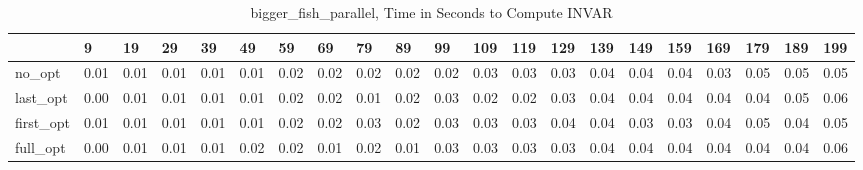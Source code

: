 \begin{table}
\caption{bigger_fish_parallel, Time in Seconds to Compute INVAR}
\label{bigger_fish_parallel_INVAR_time}
\begin{tabular}{lllllllllllllllllllll}
\toprule
 & 9 & 19 & 29 & 39 & 49 & 59 & 69 & 79 & 89 & 99 & 109 & 119 & 129 & 139 & 149 & 159 & 169 & 179 & 189 & 199 \\
\midrule
no_opt & 0.01 & 0.01 & 0.01 & 0.01 & 0.01 & 0.02 & 0.02 & 0.02 & 0.02 & 0.02 & 0.03 & 0.03 & 0.03 & 0.04 & 0.04 & 0.04 & 0.03 & 0.05 & 0.05 & 0.05 \\
last_opt & 0.00 & 0.01 & 0.01 & 0.01 & 0.01 & 0.02 & 0.02 & 0.01 & 0.02 & 0.03 & 0.02 & 0.02 & 0.03 & 0.04 & 0.04 & 0.04 & 0.04 & 0.04 & 0.05 & 0.06 \\
first_opt & 0.01 & 0.01 & 0.01 & 0.01 & 0.01 & 0.02 & 0.02 & 0.03 & 0.02 & 0.03 & 0.03 & 0.03 & 0.04 & 0.04 & 0.03 & 0.03 & 0.04 & 0.05 & 0.04 & 0.05 \\
full_opt & 0.00 & 0.01 & 0.01 & 0.01 & 0.02 & 0.02 & 0.01 & 0.02 & 0.01 & 0.03 & 0.03 & 0.03 & 0.03 & 0.04 & 0.04 & 0.04 & 0.04 & 0.04 & 0.04 & 0.06 \\
\bottomrule
\end{tabular}
\end{table}
